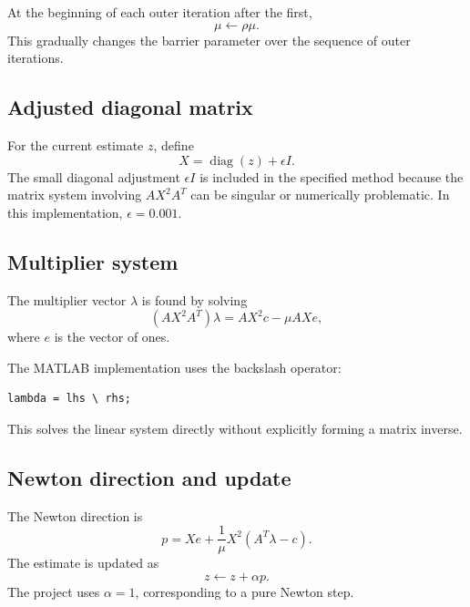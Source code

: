 \documentclass[11pt]{article}
\newcommand{\diag}{\operatorname{diag}}
\begin{document}
At the beginning of each outer iteration after the first,
\begin{equation}
\label{eq:mu-update}
\mu\leftarrow\rho\mu.
\end{equation}
This gradually changes the barrier parameter over the sequence of outer iterations.

\subsection{Adjusted diagonal matrix}

For the current estimate $z$, define
\begin{equation}
\label{eq:X}
X=\diag(z)+\epsilon I.
\end{equation}
The small diagonal adjustment $\epsilon I$ is included in the specified method because the matrix system involving $AX^2A^T$ can be singular or numerically problematic. In this implementation, $\epsilon=0.001$.

\subsection{Multiplier system}

The multiplier vector $\lambda$ is found by solving
\begin{equation}
\label{eq:lambda}
(AX^2A^T)\lambda
=
AX^2c-\mu AXe,
\end{equation}
where $e$ is the vector of ones.

The MATLAB implementation uses the backslash operator:
\begin{lstlisting}[caption={Linear solve for the multiplier vector.}]
lambda = lhs \ rhs;
\end{lstlisting}
This solves the linear system directly without explicitly forming a matrix inverse.

\subsection{Newton direction and update}

The Newton direction is
\begin{equation}
\label{eq:p}
p
=
Xe+
\frac{1}{\mu}X^2(A^T\lambda-c).
\end{equation}
The estimate is updated as
\begin{equation}
\label{eq:update}
z\leftarrow z+\alpha p.
\end{equation}
The project uses $\alpha=1$, corresponding to a pure Newton step.
\end{document}
